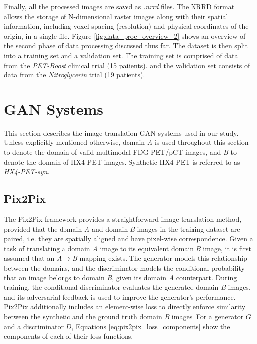 Finally, all the processed images are saved as \textit{.nrrd} files. The NRRD format allows the storage of N-dimensional raster images along with their spatial information, including voxel spacing (resolution) and physical coordinates of the origin, in a single file. Figure \ref{fig:data_proc_overview_2} shows an overview of the second phase of data processing discussed thus far. The dataset is then split into a training set and a validation set. The training set is comprised of data from the \textit{PET-Boost} clinical trial (15 patients), and the validation set consists of data from the \textit{Nitroglycerin} trial (19 patients). 



\section{GAN Systems}
\label{GAN_Systems}
This section describes the image translation GAN systems used in our study. Unless explicitly mentioned otherwise, domain \textit{A} is used throughout this section to denote the domain of valid multimodal FDG-PET/pCT images, and \textit{B} to denote the domain of HX4-PET images. Synthetic HX4-PET is referred to as \textit{HX4-PET-syn}.


\subsection{Pix2Pix}
\label{pix2pix}
The Pix2Pix framework provides a straightforward image translation method, provided that the domain \textit{A} and domain \textit{B} images in the training dataset are paired, i.e. they are spatially aligned and have pixel-wise correspondence. Given a task of translating a domain \textit{A} image to its equivalent domain \textit{B} image, it is first assumed that an \textit{A}$\rightarrow$\textit{B} mapping exists. The generator models this relationship between the domains, and the discriminator models the conditional probability that an image belongs to domain \textit{B}, given its domain \textit{A} counterpart. During training, the conditional discriminator evaluates the generated domain \textit{B} images, and its adversarial feedback is used to improve the generator's performance. Pix2Pix additionally includes an element-wise loss to directly enforce similarity between the synthetic and the ground truth domain \textit{B} images. For a generator $G$ and a discriminator $D$, Equations \ref{eq:pix2pix_loss_components} show the components of each of their loss functions. 

